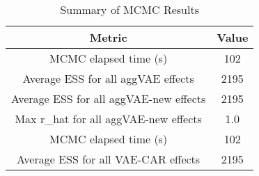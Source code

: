 
\begin{table}[h!]
\centering
\begin{tabular}{|c|c|}
\hline
\textbf{Metric} & \textbf{Value} \\
\hline
MCMC elapsed time (s) & 102 \\
\hline
Average ESS for all aggVAE effects & 2195 \\
\hline
Average ESS for all aggVAE-new effects & 2195 \\
\hline
Max r\_hat for all aggVAE-new effects & 1.0 \\
\hline
MCMC elapsed time (s) & 102 \\
\hline
Average ESS for all VAE-CAR effects & 2195 \\
\hline
\end{tabular}
\caption{Summary of MCMC Results}
\label{table:mcmc_summary}
\end{table}
